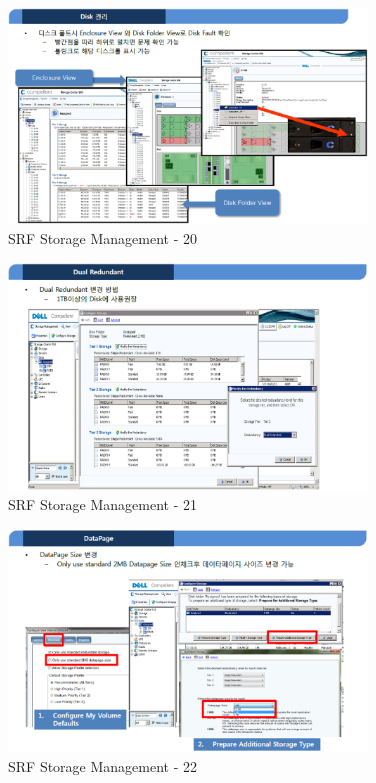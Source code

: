 \documentclass[11pt
  , a4paper
  , article
  , oneside
]{memoir}
\begin{document}
\begin{figure}[h!]
	\centering
	\includegraphics[width=0.85\textwidth]{./images/srfdb_storage_mana_20.eps}
	\caption{SRF Storage Management - 20}
	\label{fig:srfdb_mana_20} 
\end{figure}

\begin{figure}[h!]
	\centering
	\includegraphics[width=0.85\textwidth]{./images/srfdb_storage_mana_21.eps}
	\caption{SRF Storage Management - 21}
	\label{fig:srfdb_mana_21} 
\end{figure}

\begin{figure}[h!]
	\centering
	\includegraphics[width=0.85\textwidth]{./images/srfdb_storage_mana_22.eps}
	\caption{SRF Storage Management - 22}
	\label{fig:srfdb_mana_22} 
\end{figure}
\end{document}
